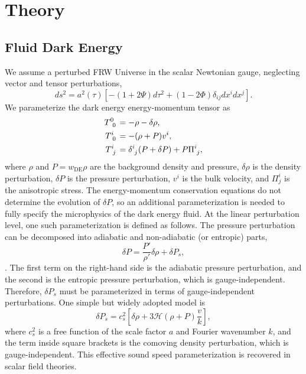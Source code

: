 \documentclass[%
reprint,
superscriptaddress,
preprint numbers,
nofootinbib,
amsmath,amssymb,
aps,
prd
]{revtex4-2}
\begin{document}
\section{Theory}
\label{sec:models}

\subsection{Fluid Dark Energy}

We assume a perturbed FRW Universe in the scalar Newtonian gauge, neglecting vector and tensor perturbations,
\begin{equation}
    ds^2 = a^2(\tau)\left[ -(1 + 2\Psi)d\tau^2 + (1 - 2\Phi)\delta_{ij}dx^idx^j \right].
\end{equation}
We parameterize the dark energy energy-momentum tensor as
\begin{subequations}
    \begin{align}
        T\indices{^0_0} &= -\rho - \delta\rho, \\
        T\indices{^i_0} &= -(\rho + P)v^i, \\
        T\indices{^i_j} &= \delta\indices{^i_j}(P + \delta P) + P\Pi\indices{^i_j},
    \end{align}
\end{subequations}
where $\rho$ and $P = w_\mathrm{DE}\rho$ are the background density and pressure, $\delta\rho$ is the density perturbation, $\delta P$ is the pressure perturbation, $v^i$ is the bulk velocity, and $\Pi^{i}_j$ is the anisotropic stress. The energy-momentum conservation equations do not determine the evolution of $\delta P$, so an additional parameterization is needed to fully specify the microphysics of the dark energy fluid. At the linear perturbation level, one such parameterization is defined as follows. The pressure perturbation can be decomposed into adiabatic and non-adiabatic (or entropic) parts,
\begin{equation}
    \delta P = \frac{P'}{\rho'}\delta\rho + \delta P_s,
\end{equation}
. The first term on the right-hand side is the adiabatic pressure perturbation, and the second is the entropic pressure perturbation, which is gauge-independent. Therefore, $\delta P_s$ must be parameterized in terms of gauge-independent perturbations.
One simple but widely adopted model is~\cite{gdm_hu}
\begin{equation}\label{eq:effective_cs}
    \delta P_s = c_s^2\left[ \delta\rho + 3\mathcal{H}(\rho + P)\frac{v}{k} \right],
\end{equation}
where $c_s^2$ is a free function of the scale factor $a$ and Fourier wavenumber $k$, and the term inside square brackets is the comoving density perturbation, which is gauge-independent. This effective sound speed parameterization is recovered in scalar field theories.
\end{document}
